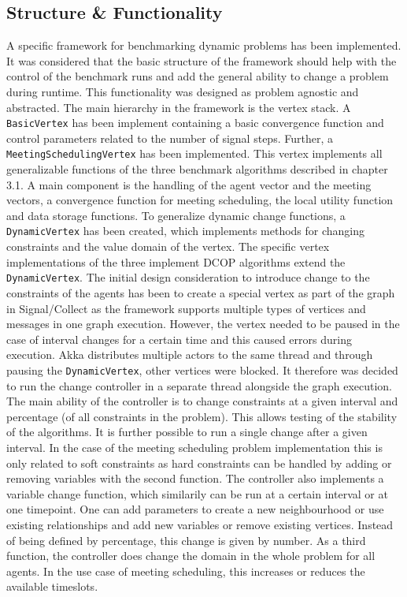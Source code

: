 \subsection{Structure \& Functionality}
A specific framework for benchmarking dynamic problems has been implemented. It was considered that the basic structure of the framework should help with the control of the benchmark runs and add the general ability to change a problem during runtime. This functionality was designed as problem agnostic and abstracted. The main hierarchy in the framework is the vertex stack. A \texttt{BasicVertex} has been implement containing a basic convergence function and control parameters related to the number of signal steps. Further, a \texttt{MeetingSchedulingVertex} has been implemented. This vertex implements all generalizable functions of the three benchmark algorithms described in chapter 3.1. A main component is the handling of the agent vector and the meeting vectors, a convergence function for meeting scheduling, the local utility function and data storage functions. 
To generalize dynamic change functions, a \texttt{DynamicVertex} has been created, which implements methods for changing constraints and the value domain of the vertex. The specific vertex implementations of the three implement DCOP algorithms extend the \texttt{DynamicVertex}.
\newline \newline
The initial design consideration to introduce change to the constraints of the agents has been to create a special vertex as part of the graph in Signal/Collect as the framework supports multiple types of vertices and messages in one graph execution. However, the vertex needed to be paused in the case of interval changes for a certain time and this caused errors during execution. Akka distributes multiple actors to the same thread and through pausing the \texttt{DynamicVertex}, other vertices were blocked. It therefore was decided to run the change controller in a separate thread alongside the graph execution. The main ability of the controller is to change constraints at a given interval and percentage (of all constraints in the problem). This allows testing of the stability of the algorithms. It is further possible to run a single change after a given interval. In the case of the meeting scheduling problem implementation this is only related to soft constraints as hard constraints can be handled by adding or removing variables with the second function. The controller also implements a variable change function, which similarily can be run at a certain interval or at one timepoint.  One can add parameters to create a new neighbourhood or use existing relationships and add new variables or remove existing vertices. Instead of being defined by percentage, this change is given by number. As a third function, the controller does change the domain in the whole problem for all agents. In the use case of meeting scheduling, this increases or reduces the available timeslots.
